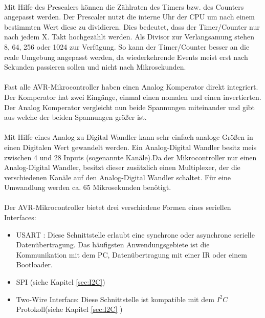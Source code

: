 \paragraph{}
Mit Hilfe des Prescalers können die Zählraten des Timers bzw. des Counters angepasst werden. Der Prescaler nutzt die interne Uhr der CPU um nach einem bestimmten Wert diese zu dividieren. Dies bedeutet, dass der Timer/Counter nur nach jedem X. Takt hochgezählt werden. Als Divisor zur Verlangsamung stehen 8, 64, 256 oder 1024 zur Verfügung. So kann der Timer/Counter besser an die reale Umgebung angepasst werden, da wiederkehrende Events meist erst nach Sekunden passieren sollen und nicht nach Mikrosekunden. 
\paragraph{}
Fast alle AVR-Mikrocontroller haben einen Analog Komperator direkt integriert. Der Komperator hat zwei Eingänge, einmal einen nomalen und einen invertierten. Der Analog Komperator vergleicht nun beide Spannungen miteinander und gibt aus welche der beiden Spannungen größer ist.
\paragraph{}
Mit Hilfe eines Analog zu Digital Wandler kann sehr einfach analoge Größen in einen Digitalen Wert gewandelt werden. Ein Analog-Digital Wandler besitz meis zwischen 4 und 28 Inputs (sogenannte Kanäle).Da der Mikrocontroller nur einen Analog-Digital Wandler, besitzt dieser zusätzlich einen Multiplexer, der die verschiedenen Kanäle auf den Analog-Digital Wandler schaltet. Für eine Umwandlung werden ca. 65 Mikrosekunden benötigt.
\paragraph{}
Der AVR-Mikrocontroller bietet drei verschiedene Formen eines seriellen Interfaces: 
\begin{itemize}
	\item \ac{USART} : Diese Schnittstelle erlaubt eine synchrone oder asynchrone serielle Datenübertragung. Das häufigsten Anwendungsgebiete ist die Kommunikation mit dem PC, Datenübertragung mit einer IR oder einem Bootloader.
	\item \ac{SPI} (siehe Kapitel \ref{sec:I2C})
	\item Two-Wire Interface: Diese Schnittstelle ist kompatible  mit dem $I^{2}C$ Protokoll(siehe Kapitel \ref{sec:I2C} )
\end{itemize}
